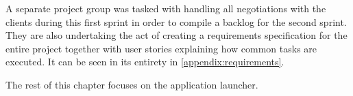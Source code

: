 A separate project group was tasked with handling all negotiations with the clients during this first sprint in order to compile a backlog for the second sprint.
They are also undertaking the act of creating a requirements specification for the entire project together with user stories explaining how common tasks are executed.
It can be seen in its entirety in \cref{appendix:requirements}.

The rest of this chapter focuses on the application launcher.